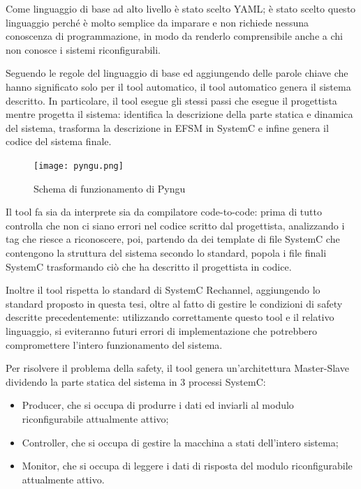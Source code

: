 \documentclass[a4paper,titlepage]{book}
\begin{document}
Come linguaggio di base ad alto livello è stato scelto YAML; è stato scelto questo linguaggio perché è molto semplice da imparare e non richiede nessuna conoscenza di programmazione, in modo da renderlo comprensibile anche a chi non conosce i sistemi riconfigurabili.

Seguendo le regole del linguaggio di base ed aggiungendo delle parole chiave che hanno significato solo per il tool automatico, il tool automatico genera il sistema descritto. In particolare, il tool esegue gli stessi passi che esegue il progettista mentre progetta il sistema: identifica la descrizione della parte statica e dinamica del sistema, trasforma la descrizione in EFSM in SystemC e infine genera il codice del sistema finale.

\begin{figure}[!ht]
\centering
\texttt{[image: pyngu.png]}
\caption{Schema di funzionamento di Pyngu}\label{fig:pynguschema}
\end{figure}


Il tool fa sia da interprete sia da compilatore code-to-code: prima di tutto controlla che non ci siano errori nel codice scritto dal progettista, analizzando i tag che riesce a riconoscere, poi, partendo da dei template di file SystemC che contengono la struttura del sistema secondo lo standard, popola i file finali SystemC trasformando ciò che ha descritto il progettista in codice.

Inoltre il tool rispetta lo standard di SystemC Rechannel, aggiungendo lo standard proposto in questa tesi, oltre al fatto di gestire le condizioni di safety descritte precedentemente: utilizzando correttamente questo tool e il relativo linguaggio, si eviteranno futuri errori di implementazione che potrebbero compromettere l'intero funzionamento del sistema.

Per risolvere il problema della safety, il tool genera un'architettura Master-Slave dividendo la parte statica del sistema in 3 processi SystemC:

\begin{itemize}
\item Producer, che si occupa di produrre i dati ed inviarli al modulo riconfigurabile attualmente attivo;
\item Controller, che si occupa di gestire la macchina a stati dell'intero sistema;
\item Monitor, che si occupa di leggere i dati di risposta del modulo riconfigurabile attualmente attivo.
\end{itemize}
\end{document}
